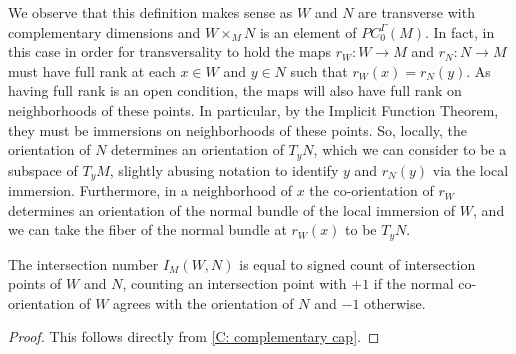 We observe that this definition makes sense as $W$ and $N$ are transverse with complementary dimensions and $W \times_M N$ is an element of $PC_0^\Gamma(M)$.
In fact, in this case in order for transversality to hold the maps $r_W \colon W \to M$ and $r_N \colon N \to M$ must have full rank at each $x \in W$ and $y \in N$ such that $r_W(x) = r_N(y)$.
As having full rank is an open condition, the maps will also have full rank on neighborhoods of these points.
In particular, by the Implicit Function Theorem, they must be immersions on neighborhoods of these points.
So, locally, the orientation of $N$ determines an orientation of $T_yN$, which we can consider to be a subspace of $T_{y}M$, slightly abusing notation to identify $y$ and $r_N(y)$ via the local immersion.
Furthermore, in a neighborhood of $x$ the co-orientation of $r_W$ determines an orientation of the normal bundle of the local immersion of $W$, and we can take the fiber of the normal bundle at $r_W(x)$ to be $T_yN$.

\begin{lemma}\label{L: intersection number}
	The intersection number $I_M(W,N)$ is equal to signed count of intersection points of $W$ and $N$, counting an intersection point with $+1$ if the normal co-orientation of $W$ agrees with the orientation of $N$ and $-1$ otherwise.
\end{lemma}

\begin{proof}
	This follows directly from \cref{C: complementary cap}.

\end{proof}

